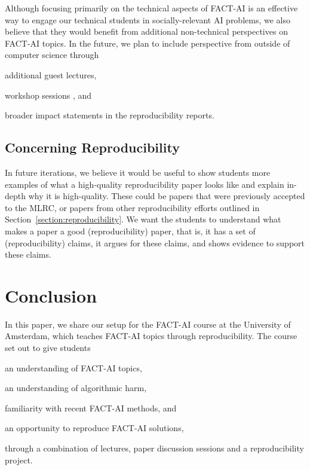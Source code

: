 \documentclass[letterpaper]{article}
\newcommand{\OurUniversity}{the University of Amsterdam}
\begin{document}
Although focusing primarily on the technical aspects of FACT-AI is an effective way to engage our technical students in socially-relevant AI problems, we also believe that they would benefit from additional non-technical perspectives on FACT-AI topics. 
In the future, we plan to include perspective from outside of computer science through 
\begin{enumerate*}[label=(\roman*)]
\item additional guest lectures, 
\item workshop sessions \citep{skirpan2018ethics,shenvalue2021}, and 
\item broader impact statements \citep{campbell2021_responsible} in the reproducibility reports. 
\end{enumerate*}

\subsection{Concerning Reproducibility}
In future iterations, we believe it would be useful to show students more examples of what a high-quality reproducibility paper looks like and explain in-depth why it is high-quality. 
These could be papers that were previously accepted to the MLRC, or papers from other reproducibility efforts outlined in Section~\ref{section:reproducibility}. 
We want the students to understand what makes a paper a good (reproducibility) paper, that is, it has a set of (reproducibility) claims, it argues for these claims, and shows evidence to support these claims.  




\section{Conclusion}
\label{section:conclusion}

In this paper, we share our setup for the FACT-AI course at \OurUniversity{}, which teaches FACT-AI topics through reproducibility. 
The course set out to give students 
\begin{enumerate*}[label=(\roman*)]
    \item an understanding of FACT-AI topics, 
    \item an understanding of algorithmic harm, 
    \item familiarity with recent FACT-AI methods, and
    \item an opportunity to reproduce FACT-AI solutions, 
\end{enumerate*}
through a combination of lectures, paper discussion sessions and a reproducibility project. 
\end{document}
